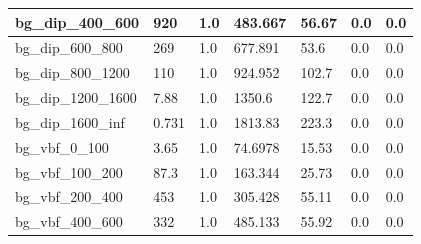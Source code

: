 \documentclass[a4paper, 10pt]{article}
\begin{document}
\begin{table}[H]
\begin{center}
\begin{tabular}{|m{23.0mm}|m{23.0mm}|m{18.0mm}|m{19.0mm}|m{19.0mm}|m{19.0mm}|m{19.0mm}|}
      \hline
      {\cellcolor{white}         bg\_dip\_400\_600}& {\cellcolor{white}         920}& {\cellcolor{white}         1.0}& {\cellcolor{white}         483.667}& {\cellcolor{white}         56.67}& {\cellcolor{green}         0.0}& {\cellcolor{green}         0.0}\\
      \hline
      {\cellcolor{white}         bg\_dip\_600\_800}& {\cellcolor{white}         269}& {\cellcolor{white}         1.0}& {\cellcolor{white}         677.891}& {\cellcolor{white}         53.6}& {\cellcolor{green}         0.0}& {\cellcolor{green}         0.0}\\
      \hline
      {\cellcolor{white}         bg\_dip\_800\_1200}& {\cellcolor{white}         110}& {\cellcolor{white}         1.0}& {\cellcolor{white}         924.952}& {\cellcolor{white}         102.7}& {\cellcolor{green}         0.0}& {\cellcolor{green}         0.0}\\
      \hline
      {\cellcolor{white}         bg\_dip\_1200\_1600}& {\cellcolor{white}         7.88}& {\cellcolor{white}         1.0}& {\cellcolor{white}         1350.6}& {\cellcolor{white}         122.7}& {\cellcolor{green}         0.0}& {\cellcolor{green}         0.0}\\
      \hline
      {\cellcolor{white}         bg\_dip\_1600\_inf}& {\cellcolor{white}         0.731}& {\cellcolor{white}         1.0}& {\cellcolor{white}         1813.83}& {\cellcolor{white}         223.3}& {\cellcolor{green}         0.0}& {\cellcolor{green}         0.0}\\
      \hline
      {\cellcolor{white}         bg\_vbf\_0\_100}& {\cellcolor{white}         3.65}& {\cellcolor{white}         1.0}& {\cellcolor{white}         74.6978}& {\cellcolor{white}         15.53}& {\cellcolor{green}         0.0}& {\cellcolor{green}         0.0}\\
      \hline
      {\cellcolor{white}         bg\_vbf\_100\_200}& {\cellcolor{white}         87.3}& {\cellcolor{white}         1.0}& {\cellcolor{white}         163.344}& {\cellcolor{white}         25.73}& {\cellcolor{green}         0.0}& {\cellcolor{green}         0.0}\\
      \hline
      {\cellcolor{white}         bg\_vbf\_200\_400}& {\cellcolor{white}         453}& {\cellcolor{white}         1.0}& {\cellcolor{white}         305.428}& {\cellcolor{white}         55.11}& {\cellcolor{green}         0.0}& {\cellcolor{green}         0.0}\\
      \hline
      {\cellcolor{white}         bg\_vbf\_400\_600}& {\cellcolor{white}         332}& {\cellcolor{white}         1.0}& {\cellcolor{white}         485.133}& {\cellcolor{white}         55.92}& {\cellcolor{green}         0.0}& {\cellcolor{green}         0.0}\\

\end{tabular}
\end{center}
\end{table}
\end{document}
